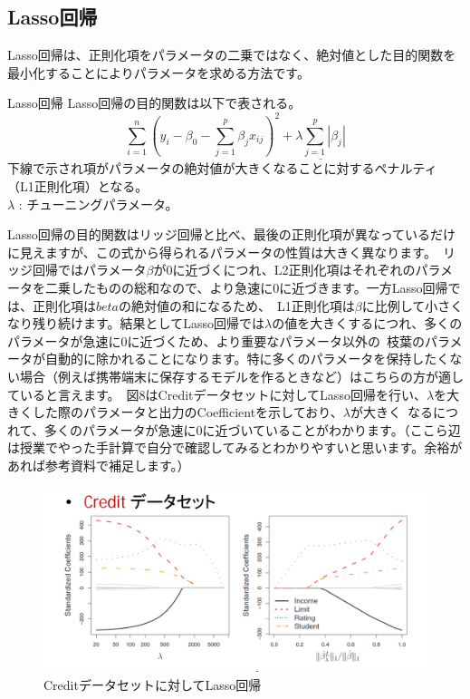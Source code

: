 \documentclass[uplatex]{jsarticle}
\begin{document}
\subsection{Lasso回帰}
Lasso回帰は、正則化項をパラメータの二乗ではなく、絶対値とした目的関数を最小化することによりパラメータを求める方法です。
\begin{itembox}[l]{Lasso回帰}
  Lasso回帰の目的関数は以下で表される。
  $$\sum_{i=1}^n \left(y_i - \beta_0 - \sum_{j=1}^p \beta_jx_{ij}\right)^2 + \underline{\lambda \sum_{j=1}^p |\beta_j|}$$
下線で示され項がパラメータの絶対値が大きくなることに対するペナルティ（L1正則化項）となる。\\
$\lambda$ : チューニングパラメータ。
\end{itembox}

Lasso回帰の目的関数はリッジ回帰と比べ、最後の正則化項が異なっているだけに見えますが、この式から得られるパラメータの性質は大きく異なります。\
リッジ回帰ではパラメータ$\beta$が0に近づくにつれ、L2正則化項はそれぞれのパラメータを二乗したものの総和なので、より急速に0に近づきます。一方Lasso回帰では、正則化項は$beta$の絶対値の和になるため、\
L1正則化項は$\beta$に比例して小さくなり残り続けます。結果としてLasso回帰では$\lambda$の値を大きくするにつれ、多くのパラメータが急速に0に近づくため、より重要なパラメータ以外の\
枝葉のパラメータが自動的に除かれることになります。特に多くのパラメータを保持したくない場合（例えば携帯端末に保存するモデルを作るときなど）はこちらの方が適していると言えます。\
図8はCreditデータセットに対してLasso回帰を行い、$\lambda$を大きくした際のパラメータと出力のCoefficientを示しており、$ \lambda$が大きく\
なるにつれて、多くのパラメータが急速に0に近づいていることがわかります。（ここら辺は授業でやった手計算で自分で確認してみるとわかりやすいと思います。余裕があれば参考資料で補足します。）
\begin{figure}
  \begin{center}
    \includegraphics[width=13cm]{img/lasso_lmd.png}
    \caption{Creditデータセットに対してLasso回帰}
  \end{center}
\end{figure}
\end{document}
